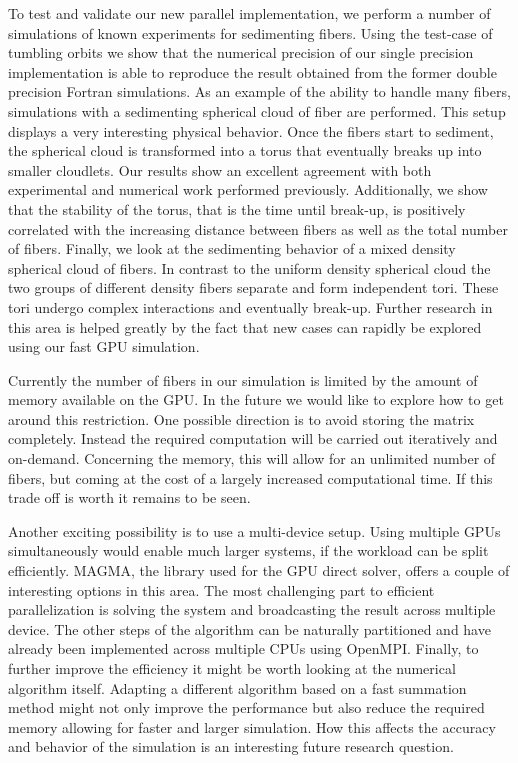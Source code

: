 To test and validate our new parallel implementation, we perform a number of simulations of known experiments for sedimenting fibers. Using the test-case of tumbling orbits we show that the numerical precision of our single precision implementation is able to reproduce the result obtained from the former double precision Fortran simulations. As an example of the ability to handle many fibers, simulations with a sedimenting spherical cloud of fiber are performed. This setup displays a very interesting physical behavior. Once the fibers start to sediment, the spherical cloud is transformed into a torus that eventually breaks up into smaller cloudlets. Our results show an excellent agreement with both experimental and numerical work performed previously. Additionally, we show that the stability of the torus, that is the time until break-up, is positively correlated with the increasing distance between fibers as well as the total number of fibers. Finally, we look at the sedimenting behavior of a mixed density spherical cloud of fibers. In contrast to the uniform density spherical cloud the two groups of different density fibers separate and form independent tori. These tori undergo complex interactions and eventually break-up. Further research in this area is helped greatly by the fact that new cases can rapidly be explored using our fast GPU simulation.

Currently the number of fibers in our simulation is limited by the amount of memory available on the GPU. In the future we would like to explore how to get around this restriction. One possible direction is to avoid storing the matrix completely. Instead the required computation will be carried out iteratively and on-demand. Concerning the memory, this will allow for an unlimited number of fibers, but coming at the cost of a largely increased computational time. If this trade off is worth it remains to be seen.

Another exciting possibility is to use a multi-device setup. Using multiple GPUs simultaneously would enable much larger systems, if the workload can be split efficiently. MAGMA, the library used for the GPU direct solver, offers a couple of interesting options in this area. The most challenging part to efficient parallelization is solving the system and broadcasting the result across multiple device. The other steps of the algorithm can be naturally partitioned and have already been implemented across multiple CPUs using OpenMPI.
\enlargethispage{\baselineskip}
Finally, to further improve the efficiency it might be worth looking at the numerical algorithm itself. Adapting a different algorithm based on a fast summation method might not only improve the performance but also reduce the required memory allowing for faster and larger simulation. How this affects the accuracy and behavior of the simulation is an interesting future research question.
